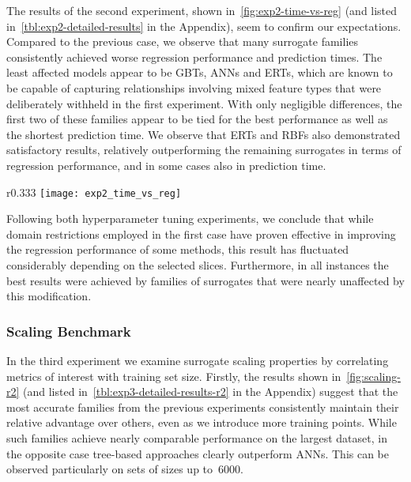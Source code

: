The results of the second experiment, shown in~\cref{fig:exp2-time-vs-reg} (and listed
in~\cref{tbl:exp2-detailed-results} in the Appendix),
seem to confirm our expectations. Compared to the previous case, we observe
that many surrogate families consistently achieved worse regression
performance and prediction times. The least
affected models appear to be GBTs, ANNs and ERTs, which are known to be capable of capturing relationships
involving mixed feature types that were deliberately withheld in the first
experiment. With only negligible differences, the first two of these families
appear to be tied for the best performance as well as the shortest prediction
time. We observe that ERTs and RBFs also
demonstrated satisfactory results, relatively outperforming the remaining surrogates in
terms of regression performance, and in some cases also in prediction time.

\begin{wrapfigure}[10]{r}{0.333\textwidth}
	\centering
	\vspace{-2ex}
	\texttt{[image: exp2\_time\_vs\_reg]}
	\caption{Results of experiment~2, plotted analogously
	to~\cref{fig:exp1-time-vs-reg}.}
	\label{fig:exp2-time-vs-reg}
\end{wrapfigure}

Following both hyperparameter tuning experiments, we conclude that while domain
restrictions employed in the first case have proven effective in improving the
regression performance of some methods, this result has fluctuated considerably
depending on the selected slices. Furthermore, in all instances the best
results were achieved by families of surrogates that were nearly unaffected by
this modification.


\subsubsection{Scaling Benchmark}

In the third experiment we examine surrogate scaling properties by correlating
metrics of interest with training set size. Firstly, the results shown 
in~\cref{fig:scaling-r2} (and listed in~\cref{tbl:exp3-detailed-results-r2} in
the Appendix) suggest that the most accurate families from the previous experiments
consistently maintain their relative advantage over others, even as we introduce
more training points. While such families achieve nearly comparable
performance on the largest dataset, in the opposite case tree-based approaches
clearly outperform ANNs. This can be observed
particularly on sets of sizes up to~\num{6000}.

